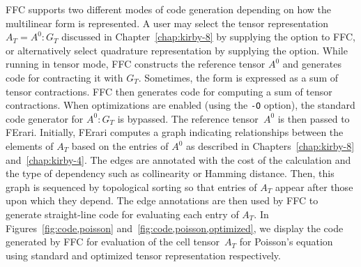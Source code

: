 FFC supports two different modes of code generation depending on how
the multilinear form is represented. A user may select the tensor
representation $A_T = A^0 : G_T$ discussed in
Chapter~\ref{chap:kirby-8} by supplying the  option to
FFC, or alternatively select quadrature representation by supplying
the  option.  While running in tensor mode, FFC
constructs the reference tensor $A^0$ and generates code for
contracting it with $G_T$. Sometimes, the form is expressed as a sum
of tensor contractions. FFC then generates code for computing a sum of
tensor contractions.  When optimizations are enabled (using the
\texttt{-O} option), the standard code generator for $A^0 : G_T$ is
bypassed. The reference tensor~$A^0$ is then passed to
FErari. Initially, FErari computes a graph indicating relationships
between the elements of $A_T$ based on the entries of $A^0$ as
described in Chapters~\ref{chap:kirby-8} and~\ref{chap:kirby-4}. The
edges are annotated with the cost of the calculation and the type of
dependency such as collinearity or Hamming distance. Then, this graph
is sequenced by topological sorting so that entries of $A_T$ appear
after those upon which they depend. The edge annotations are then used
by FFC to generate straight-line code for evaluating each entry of
$A_T$. In Figures~\ref{fig:code,poisson}
and~\ref{fig:code,poisson,optimized}, we display the code generated by
FFC for evaluation of the cell tensor~$A_T$ for Poisson's equation
using standard and optimized tensor representation respectively.

